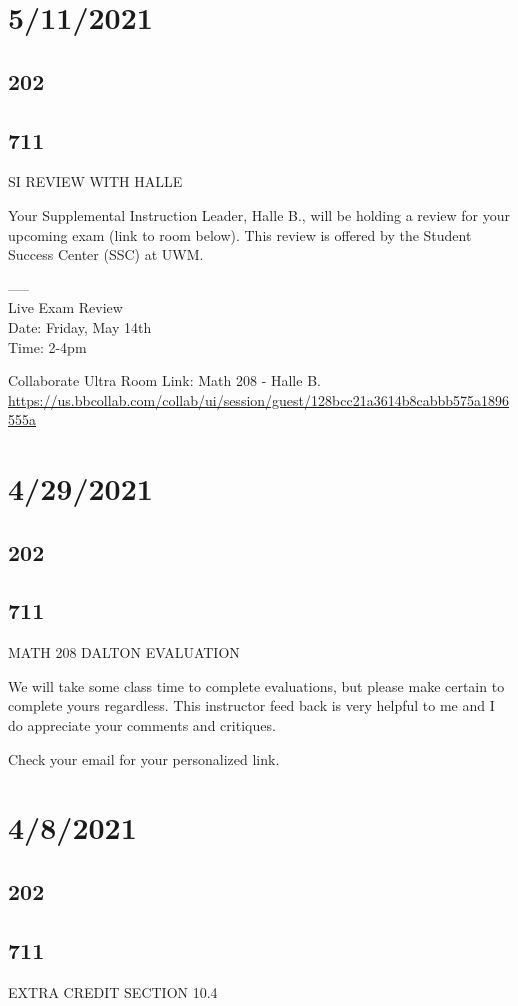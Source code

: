 \documentclass[]{article}
\begin{document}
\section*{5/11/2021}
\subsection*{202}
\subsection*{711}
SI REVIEW WITH HALLE

Your Supplemental Instruction Leader, Halle B., will be holding a review for your upcoming exam (link to room below). This review is offered by the Student Success Center (SSC) at UWM. 

-----\\
Live Exam Review \\
Date: Friday, May 14th\\
Time: 2-4pm

Collaborate Ultra Room Link: Math 208 - Halle B.
\url{https://us.bbcollab.com/collab/ui/session/guest/128bcc21a3614b8cabbb575a1896555a}

\section*{4/29/2021}
\subsection*{202}
\subsection*{711}
MATH 208 DALTON EVALUATION

We will take some class time to complete evaluations, but please make certain to complete yours regardless. This instructor feed back is very helpful to me and I do appreciate your comments and critiques.

Check your email for your personalized link.

\section*{4/8/2021}
\subsection*{202}
\subsection*{711}
EXTRA CREDIT SECTION 10.4
\end{document}
